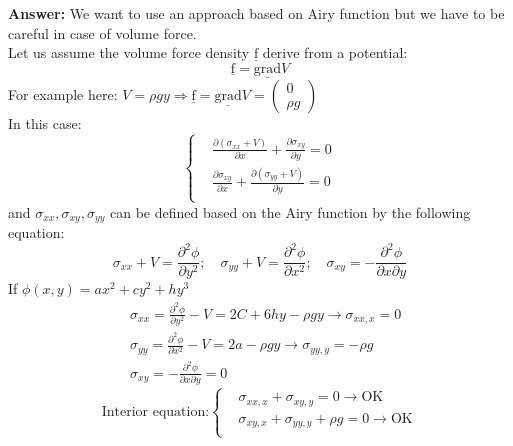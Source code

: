 \textbf{Answer:} We want to use an approach based on Airy function but we have to be careful in case of volume force.\\
Let us assume the volume force density $\underline{\text{f}}$ derive from a potential:
\begin{equation}
\underline{\text{f}}=\underline{\text{grad}}V
\end{equation}
For example here: $V = \rho gy \Rightarrow \underline{\text{f}} = \underline{\text{grad}}V = \left( \begin{matrix}
0\\\rho g
\end{matrix} \right) $\\
In this case:
\begin{equation} \left\lbrace
\begin{split}
& \frac{\partial(\sigma_{xx}+V)}{\partial x} + \frac{\partial \sigma_{xy}}{\partial y} = 0 \\
& \frac{\partial \sigma_{xy}}{\partial x} + \frac{\partial(\sigma_{yy}+V)}{\partial y} = 0 \\
\end{split} \right.
\end{equation}
and $\sigma_{xx}, \sigma_{xy}, \sigma_{yy}$ can be defined based on the Airy function by the following equation:
\begin{equation}
\sigma_{xx} + V = \frac{\partial^2 \phi}{\partial y^2}; \quad \sigma_{yy} + V = \frac{\partial^2 \phi}{\partial x^2}; \quad \sigma_{xy} = -\frac{\partial^2 \phi}{\partial x \partial y}
\end{equation}
If $\phi (x,y) = ax^2+cy^2+hy^3 $
\begin{equation}
\begin{split}
& \sigma_{xx} = \frac{\partial^2 \phi}{\partial y^2} - V = 2C+6hy- \rho gy \rightarrow \sigma_{xx,x} = 0 \\
& \sigma_{yy} = \frac{\partial^2 \phi}{\partial x^2} - V = 2a - \rho gy \rightarrow \sigma_{yy,y}=-\rho g\\
& \sigma_{xy} = -\frac{\partial^2 \phi}{\partial x \partial y} = 0
\end{split}
\end{equation}
\begin{equation}
\text{Interior equation:} \left\lbrace \begin{split}
& \sigma_{xx,x} + \sigma_{xy,y} = 0 \rightarrow \text{OK}\\
& \sigma_{xy,x} + \sigma_{yy,y} + \rho g = 0 \rightarrow \text{OK}\\
\end{split} \right.
\end{equation}
